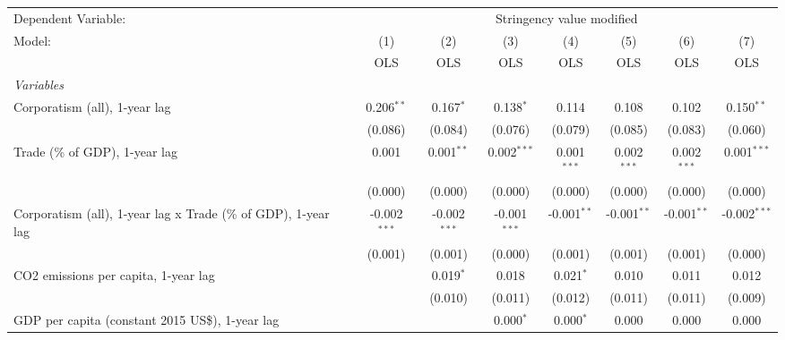 
\begingroup
\centering
\begin{tabular}{lccccccc}
   \toprule
   Dependent Variable: & \multicolumn{7}{c}{Stringency value modified}\\
   Model:                                                         & (1)            & (2)            & (3)            & (4)           & (5)           & (6)           & (7)\\  
                                                                  &  OLS           & OLS            & OLS            & OLS           & OLS           & OLS           & OLS\\  
   \midrule
   \emph{Variables}\\
   Corporatism (all), 1-year lag                                  & 0.206$^{**}$   & 0.167$^{*}$    & 0.138$^{*}$    & 0.114         & 0.108         & 0.102         & 0.150$^{**}$\\   
                                                                  & (0.086)        & (0.084)        & (0.076)        & (0.079)       & (0.085)       & (0.083)       & (0.060)\\   
   Trade (\% of GDP), 1-year lag                                  & 0.001          & 0.001$^{**}$   & 0.002$^{***}$  & 0.001$^{***}$ & 0.002$^{***}$ & 0.002$^{***}$ & 0.001$^{***}$\\   
                                                                  & (0.000)        & (0.000)        & (0.000)        & (0.000)       & (0.000)       & (0.000)       & (0.000)\\   
   Corporatism (all), 1-year lag x Trade (\% of GDP), 1-year lag  & -0.002$^{***}$ & -0.002$^{***}$ & -0.001$^{***}$ & -0.001$^{**}$ & -0.001$^{**}$ & -0.001$^{**}$ & -0.002$^{***}$\\   
                                                                  & (0.001)        & (0.001)        & (0.000)        & (0.001)       & (0.001)       & (0.001)       & (0.000)\\   
   CO2 emissions per capita, 1-year lag                           &                & 0.019$^{*}$    & 0.018          & 0.021$^{*}$   & 0.010         & 0.011         & 0.012\\   
                                                                  &                & (0.010)        & (0.011)        & (0.012)       & (0.011)       & (0.011)       & (0.009)\\   
   GDP per capita (constant 2015 US\$), 1-year lag                &                &                & 0.000$^{*}$    & 0.000$^{*}$   & 0.000         & 0.000         & 0.000\\   

\end{tabular}
